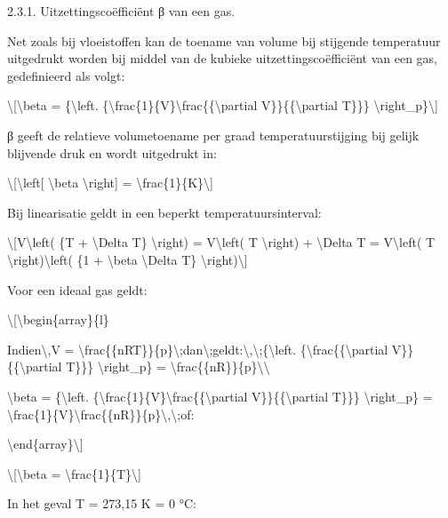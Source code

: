 \documentclass[]{article}
\begin{document}
2.3.1. Uitzettingscoëfficiënt β van een gas.

Net zoals bij vloeistoffen kan de toename van volume bij stijgende
temperatuur uitgedrukt worden bij middel van de kubieke
uitzettingscoëfficiënt van een gas, gedefinieerd als volgt:

\textbackslash{}{[}\textbackslash{}beta = \{\textbackslash{}left.
\{\textbackslash{}frac\{1\}\{V\}\textbackslash{}frac\{\{\textbackslash{}partial
V\}\}\{\{\textbackslash{}partial T\}\}\}
\textbackslash{}right\textbar{}\_p\}\textbackslash{}{]}

β geeft de relatieve volumetoename per graad temperatuurstijging bij
gelijk blijvende druk en wordt uitgedrukt in:

\textbackslash{}{[}\textbackslash{}left{[} \textbackslash{}beta
\textbackslash{}right{]} =
\textbackslash{}frac\{1\}\{K\}\textbackslash{}{]}

Bij linearisatie geldt in een beperkt temperatuursinterval:

\textbackslash{}{[}V\textbackslash{}left( \{T + \textbackslash{}Delta
T\} \textbackslash{}right) = V\textbackslash{}left( T
\textbackslash{}right) + \textbackslash{}Delta T =
V\textbackslash{}left( T \textbackslash{}right)\textbackslash{}left( \{1
+ \textbackslash{}beta \textbackslash{}Delta T\}
\textbackslash{}right)\textbackslash{}{]}

Voor een ideaal gas geldt:

\textbackslash{}{[}\textbackslash{}begin\{array\}\{l\}

Indien\textbackslash{},V =
\textbackslash{}frac\{\{nRT\}\}\{p\}\textbackslash{};dan\textbackslash{};geldt:\textbackslash{},\textbackslash{};\{\textbackslash{}left.
\{\textbackslash{}frac\{\{\textbackslash{}partial
V\}\}\{\{\textbackslash{}partial T\}\}\}
\textbackslash{}right\textbar{}\_p\} =
\textbackslash{}frac\{\{nR\}\}\{p\}\textbackslash{}\textbackslash{}

\textbackslash{}beta = \{\textbackslash{}left.
\{\textbackslash{}frac\{1\}\{V\}\textbackslash{}frac\{\{\textbackslash{}partial
V\}\}\{\{\textbackslash{}partial T\}\}\}
\textbackslash{}right\textbar{}\_p\} =
\textbackslash{}frac\{1\}\{V\}\textbackslash{}frac\{\{nR\}\}\{p\}\textbackslash{},\textbackslash{};of:

\textbackslash{}end\{array\}\textbackslash{}{]}

\textbackslash{}{[}\textbackslash{}beta =
\textbackslash{}frac\{1\}\{T\}\textbackslash{}{]}

In het geval T = 273,15 K = 0 °C:
\end{document}
